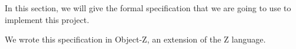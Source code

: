 In this section, we will give the formal specification that we are going to use to implement this project.

We wrote this specification in Object-Z, an extension of the Z language.
